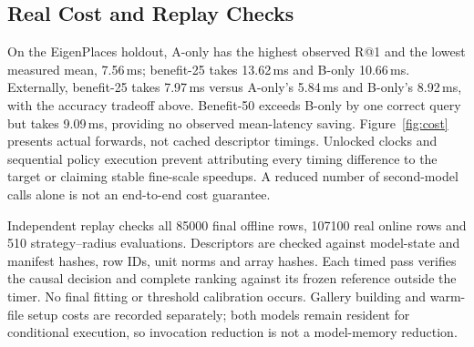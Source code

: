 \documentclass[conference]{IEEEtran}
\begin{document}
\subsection{Real Cost and Replay Checks}
On the EigenPlaces holdout, A-only has the highest observed R@1 and the
lowest measured mean, 7.56\,ms; benefit-25 takes 13.62\,ms and B-only
10.66\,ms. Externally, benefit-25 takes 7.97\,ms versus A-only's
5.84\,ms and B-only's 8.92\,ms, with the accuracy tradeoff above.
Benefit-50 exceeds B-only by one correct query but takes 9.09\,ms,
providing no observed mean-latency saving. Figure~\ref{fig:cost} presents
actual forwards, not cached descriptor timings. Unlocked clocks and
sequential policy execution prevent attributing every timing difference
to the target or claiming stable fine-scale speedups. A reduced number
of second-model calls alone is not an end-to-end cost guarantee.

Independent replay checks all 85000 final offline rows, 107100 real
online rows and 510 strategy--radius evaluations. Descriptors are checked
against model-state and manifest hashes, row IDs, unit norms and array
hashes. Each timed pass verifies the causal decision and complete ranking
against its frozen reference outside the timer. No final fitting or
threshold calibration occurs. Gallery building and warm-file setup costs
are recorded separately; both models remain resident for conditional
execution, so invocation reduction is not a model-memory reduction.
\end{document}
